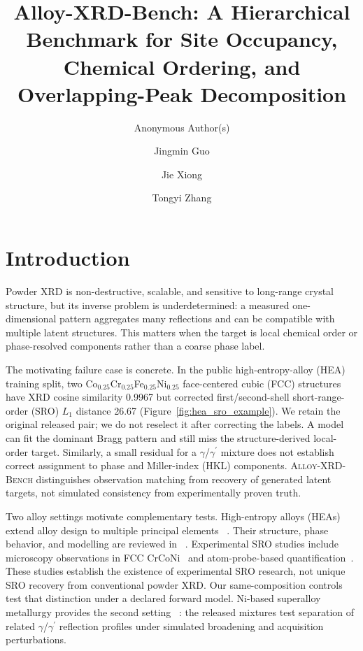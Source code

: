 \documentclass[sigconf,review,anonymous]{acmart}
\title[Alloy-XRD-Bench]{Alloy-XRD-Bench: A Hierarchical Benchmark for Site Occupancy, Chemical Ordering, and Overlapping-Peak Decomposition}
\author{Anonymous Author(s)}
\affiliation{
  \institution{Anonymous Institution}
  \country{Anonymous}
}
\author{Jingmin Guo}
\affiliation{
  \institution{Shanghai University}
  \city{Shanghai}
  \country{China}
}
\author{Jie Xiong}
\affiliation{
  \institution{Shanghai University}
  \city{Shanghai}
  \country{China}
}
\author{Tongyi Zhang}
\affiliation{
  \institution{Shanghai University}
  \city{Shanghai}
  \country{China}
}
\newcommand{\dataset}{\textsc{Alloy-XRD-Bench}}
\newcommand{\gphase}{$\gamma$}
\newcommand{\gp}{\ensuremath{\gamma^{\prime}}}
\newenvironment{revision}{\ifdefined\markedcopy\color{red!70!black}\else\color{black}\fi}{}
\begin{document}
\maketitle

\section{Introduction}

Powder XRD is non-destructive, scalable, and sensitive to long-range crystal
structure, but its inverse problem is underdetermined: a measured
one-dimensional pattern aggregates many reflections and can be compatible with
multiple latent structures. This matters when the target is local chemical
order or phase-resolved components rather than a coarse phase label.

\begin{revision}
The motivating failure case is concrete. In the public high-entropy-alloy
(HEA) training split, two Co$_{0.25}$Cr$_{0.25}$Fe$_{0.25}$Ni$_{0.25}$
face-centered cubic (FCC) structures have XRD cosine similarity 0.9967 but
corrected first/second-shell short-range-order (SRO) $L_1$ distance 26.67
(Figure~\ref{fig:hea_sro_example}). We retain the original released pair;
we do not reselect it after correcting the labels. A model can fit the
dominant Bragg pattern and still miss the structure-derived local-order
target. Similarly, a small residual for a \gphase{}/\gp{} mixture does not
establish correct assignment to phase and Miller-index (HKL) components.
\dataset{} distinguishes observation matching from recovery of generated
latent targets, not simulated consistency from experimentally proven truth.
\end{revision}

Two alloy settings motivate complementary tests. High-entropy alloys (HEAs)
extend alloy design to multiple principal elements
~\cite{yeh2004hea,cantor2004multicomponent}. Their structure, phase behavior,
and modelling are reviewed in
~\cite{pickering2016hea,gorsse2018hea,widom2014hea,miracle2017hea,george2019hea}.
\begin{revision}
Experimental SRO studies include microscopy observations in FCC
CrCoNi~\cite{zhang2020sro} and atom-probe-based
quantification~\cite{he2024apt}. These studies establish the existence of
experimental SRO research, not unique SRO recovery from conventional powder XRD.
\end{revision}
Our same-composition controls test that distinction under a declared forward
model. Ni-based superalloy metallurgy provides the second setting
~\cite{reed2006superalloys,pollock2006superalloys,sims1987superalloys,durand1997superalloys}:
the released mixtures test separation of related \gphase{}/\gp{} reflection
profiles under simulated broadening and acquisition perturbations.
\end{document}
